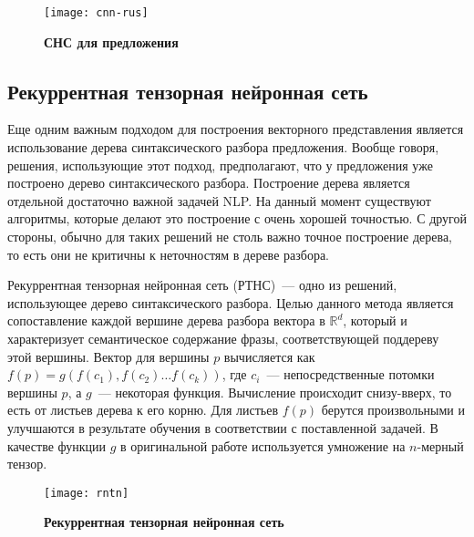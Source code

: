 \begin{figure}[h]
\texttt{[image: cnn-rus]}
\caption{\textbf{СНС для предложения}}
\label{fig:cnn}
\end{figure}

\subsection{Рекуррентная тензорная нейронная сеть}
Еще одним важным подходом для построения векторного представления является использование 
дерева синтаксического разбора предложения. Вообще говоря, решения, использующие этот подход, предполагают, что у предложения уже построено дерево синтаксического разбора. Построение дерева является отдельной достаточно важной задачей NLP. На данный момент существуют алгоритмы, которые делают это построение с очень хорошей точностью\cite{lex-parser, chen2014fast}. 
С другой стороны, обычно для таких решений не столь важно точное построение дерева, то есть они не критичны к неточностям в дереве разбора.

Рекуррентная тензорная нейронная сеть (РТНС)~--- одно из решений, использующее дерево синтаксического разбора. Целью данного метода является сопоставление каждой вершине дерева разбора вектора в $\mathbb{R}^d$, 
который и характеризует семантическое содержание фразы, соответствующей поддереву этой вершины.
Вектор для вершины $p$ вычисляется как $f(p)=g(f(c_1), f(c_2) \dots{} f(c_k))$, где $c_i$~--- непосредственные потомки вершины $p$, а $g$~--- некоторая функция. Вычисление происходит снизу-вверх, то
есть от листьев дерева к его корню. Для листьев $f(p)$ берутся произвольными и улучшаются в результате обучения в соответствии с поставленной задачей.
В качестве функции $g$ в оригинальной работе\cite{socher-EtAl:2013:EMNLP} используется умножение на $n$-мерный тензор.

\begin{figure}[h]
\texttt{[image: rntn]}
\caption{\textbf{Рекуррентная тензорная нейронная сеть}}
\label{fig:rntn}
\end{figure}